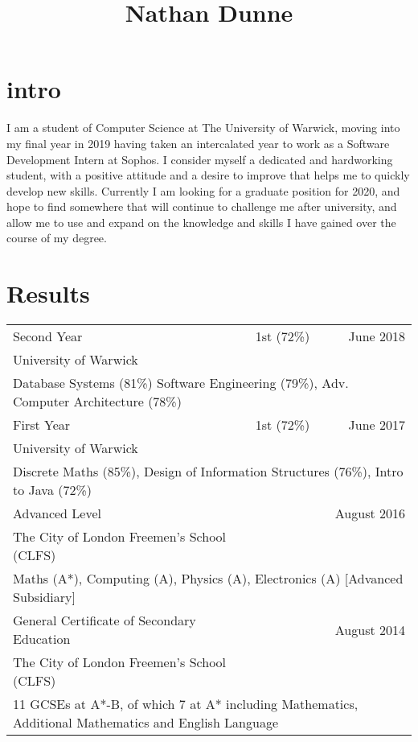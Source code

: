 \documentclass{article}
\title{Nathan Dunne}
\author{}
\date{}
\begin{document}
\maketitle
 \section{intro}
I am a student of Computer Science at The University of Warwick, moving into my final year in 2019 having taken an intercalated year to work as a Software Development Intern at Sophos. I consider myself a dedicated and hardworking student, with a positive attitude and a desire to improve that helps me to quickly develop new skills. Currently I am looking for a graduate position for 2020, and hope to find somewhere that will continue to challenge me after university, and allow me to use and expand on the knowledge and skills I have gained over the course of
my degree.
 
 \section{Results}
  \begin{tabularx}{\textwidth}{ X X r }
Second Year & 1st (72\%) & June 2018 \\
University of Warwick & & \\
\multicolumn{3}{l}{\hspace{2em} Database Systems (81\%) Software Engineering (79\%), Adv. Computer Architecture (78\%)}\\
\vspace{1ex}
First Year & 1st (72\%) & June 2017 \\    
University of Warwick & & \\
\multicolumn{3}{l}{\hspace{2em} Discrete Maths (85\%), Design of Information Structures (76\%), Intro to Java (72\%)}\\
\vspace{1ex}
Advanced Level & & August 2016 \\
The City of London Freemen’s School (CLFS) & & \\                             
\multicolumn{3}{l}{\hspace{2em} Maths (A*), Computing (A), Physics (A), Electronics (A) [Advanced Subsidiary]}\\
\vspace{1ex}
General Certificate of Secondary Education & & August 2014 \\
The City of London Freemen’s School (CLFS) & & \\                        
\multicolumn{3}{l}{\hspace{2em} 11 GCSEs at A*-B, of which 7 at A* including Mathematics, Additional Mathematics and English Language}\\
  \end{tabularx}
 
\end{document}
